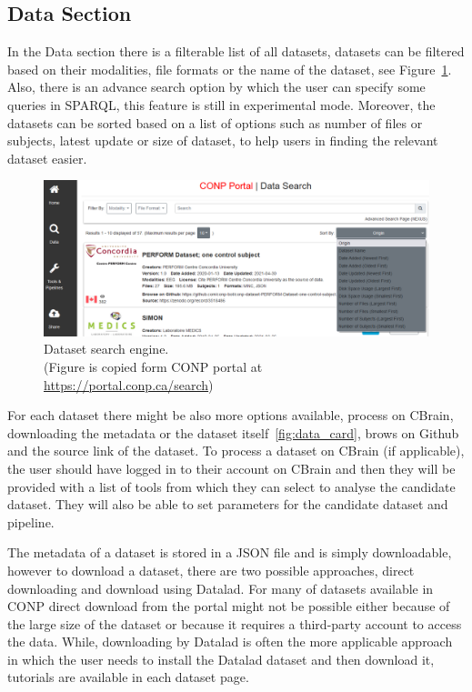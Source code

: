 \subsection{Data Section}
In the Data section there is a filterable list of all datasets,
datasets can be filtered based on their modalities, file formats or the name of the dataset, see Figure~\ref{fig:search_data}. Also, there is an advance search option by which the user can specify some queries in SPARQL, this feature is still in experimental mode. Moreover, the datasets can be sorted based on a list of options such as number of files or subjects, latest update or size of dataset, to help users in finding the relevant dataset easier.

\begin{figure}[ht]
  \centering
  \includegraphics[width=\textwidth,height=\textheight,keepaspectratio]{figures/dataset_search.png}
  \caption{Dataset search engine. \\(Figure is copied form CONP portal at \url{https://portal.conp.ca/search})}
  \label{fig:search_data}
\end{figure} 

For each dataset there might be also more options available, process on CBrain, downloading the metadata or the dataset itself~\ref{fig:data_card}, brows on Github and the source link of the dataset. To process a dataset on CBrain (if applicable), the user should have logged in to their account on CBrain and then they will be provided with a list of tools from which they can select to analyse the candidate dataset. They will also be able to set parameters for the candidate dataset and pipeline. 

The metadata of a dataset is stored in a JSON file and is simply downloadable, however to download a dataset, there are two possible approaches, direct downloading and download using Datalad. For many of datasets available in CONP direct download from the portal might not be possible either because of the large size of the dataset or because it requires a third-party account to access the data. While, downloading by Datalad is often the more applicable approach in which the user needs to install the Datalad dataset and then download it, tutorials are available in each dataset page. 




